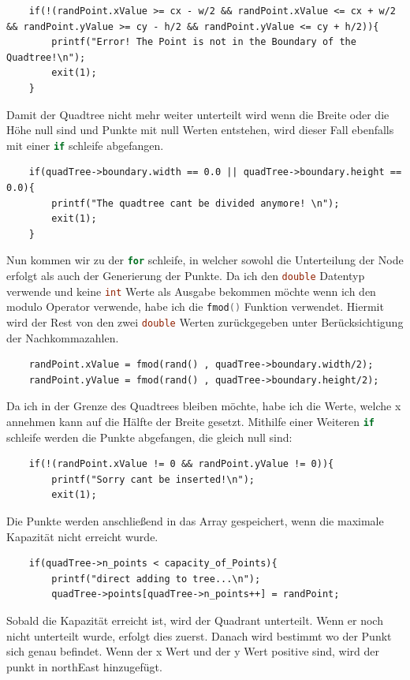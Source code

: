 \documentclass[11pt]{article}
\newcommand{\qt}{Quadtree }
\newcommand{\qts}{Quadtrees }
\newcommand{\lstin}[1]{\lstinline[language=C]{#1}}
\begin{document}
\begin{lstlisting}
    if(!(randPoint.xValue >= cx - w/2 && randPoint.xValue <= cx + w/2 && randPoint.yValue >= cy - h/2 && randPoint.yValue <= cy + h/2)){
        printf("Error! The Point is not in the Boundary of the Quadtree!\n");
        exit(1); 
    }
\end{lstlisting}
Damit der \qt nicht mehr weiter unterteilt wird wenn die Breite oder die Höhe null sind und  Punkte mit null Werten entstehen, wird dieser Fall ebenfalls mit einer \lstin{if} schleife abgefangen. 
\begin{lstlisting}
    if(quadTree->boundary.width == 0.0 || quadTree->boundary.height == 0.0){
        printf("The quadtree cant be divided anymore! \n");
        exit(1); 
    }
\end{lstlisting}
Nun kommen wir zu der \lstin{for} schleife, in welcher sowohl die Unterteilung der Node erfolgt als auch der Generierung der Punkte.\newline
Da ich den \lstin{double} Datentyp verwende und keine \lstin{int} Werte als Ausgabe bekommen möchte wenn ich den modulo Operator verwende, habe ich die \lstin{fmod()} Funktion verwendet. Hiermit wird der Rest von den zwei \lstin{double} Werten zurückgegeben unter Berücksichtigung der Nachkommazahlen. 
\begin{lstlisting}
    randPoint.xValue = fmod(rand() , quadTree->boundary.width/2); 
    randPoint.yValue = fmod(rand() , quadTree->boundary.height/2); 
\end{lstlisting}
Da ich in der Grenze des \qts bleiben möchte, habe ich die Werte, welche x annehmen kann auf die Hälfte der Breite gesetzt. 
Mithilfe einer Weiteren \lstin{if} schleife werden die Punkte abgefangen, die gleich null sind: 
\begin{lstlisting}
    if(!(randPoint.xValue != 0 && randPoint.yValue != 0)){
        printf("Sorry cant be inserted!\n");
        exit(1);
\end{lstlisting}
Die Punkte werden anschließend in das Array gespeichert, wenn die maximale Kapazität nicht erreicht wurde. 
\begin{lstlisting}
    if(quadTree->n_points < capacity_of_Points){
        printf("direct adding to tree...\n");
        quadTree->points[quadTree->n_points++] = randPoint; 
\end{lstlisting}
Sobald die Kapazität erreicht ist, wird der Quadrant unterteilt. Wenn er noch nicht unterteilt wurde, erfolgt dies zuerst. Danach wird bestimmt wo der Punkt sich genau befindet. Wenn der x Wert und der y Wert positive sind, wird der punkt in northEast hinzugefügt.
\end{document}
